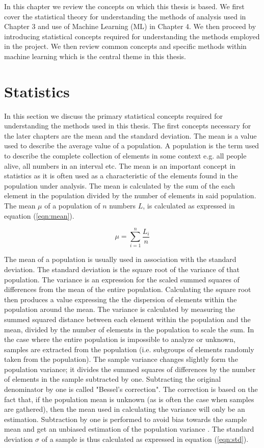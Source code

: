 In this chapter we review the concepts on which this thesis is based. We first cover the statistical theory for understanding the methods of analysis used in Chapter 3 and use of Machine Learning (ML) in Chapter 4. We then proceed by introducing statistical concepts required for understanding the methods employed in the project. We then review common concepts and specific methods within machine learning which is the central theme in this thesis.


\section{Statistics}

In this section we discuss the primary statistical concepts required for understanding the methods used in this thesis. The first concepts necessary for the later chapters are the mean and the standard deviation. The mean is a value used to describe the average value of a population. A population is the term used to describe the complete collection of elements in some context e.g. all people alive, all numbers in an interval etc. The mean is an important concept in statistics as it is often used as a characteristic of the elements found in the population under analysis. The mean is calculated by the sum of the each element in the population divided by the number of elements in said population. The mean $\mu$ of a population of $n$ numbers $L$, is calculated as expressed in equation (\ref{eqn:mean}).

\begin{equation}
\label{eqn:mean}
\mu = \sum_{i=1}^n \frac{L_i}{n}
\end{equation}

The mean of a population is usually used in association with the standard deviation. The standard deviation is the square root of the variance of that population. The variance is an expression for the scaled summed squares of differences from the mean of the entire population. Calculating the square root then produces a value expressing the the dispersion of elements within the population around the mean. The variance is calculated by measuring the summed squared distance between each element within the population and the mean, divided by the number of elements in the population to scale the sum. In the case where the entire population is impossible to analyze or unknown, samples are extracted from the population (i.e. subgroups of elements randomly taken from the population). The sample variance changes slightly form the population variance; it divides the summed squares of differences by the number of elements in the sample subtracted by one. Subtracting the original denominator by one is called "Bessel's correction". The correction is based on the fact that, if the population mean is unknown (as is often the case when samples are gathered), then the mean used in calculating the variance will only be an estimation. Subtraction by one is performed to avoid bias towards the sample mean and get an unbiased estimation of the population variance \cite{so2008sample, nobach2020practical}. The standard deviation $\sigma$ of a sample is thus calculated as expressed in equation (\ref{eqn:std}).

